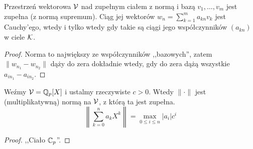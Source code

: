 \begin{fakt}
	Przestrzeń wektorowa $\mathcal V$ nad zupełnym ciałem z normą i bazą $v_1, \ldots, v_m$ jest zupełna (z normą supremum).
	Ciąg jej wektorów $w_n = \sum_{k=1}^m a_{kn}v_k$ jest Cauchy'ego, wtedy i tylko wtedy gdy takie są ciągi jego współczynników $(a_{kn})$ w ciele $\mathcal K$.
\end{fakt}

\begin{proof}
	Norma to największy ze współczynników ,,bazowych'', zatem $\|w_{n_1} - w_{n_2}\|$ dąży do zera dokładnie wtedy, gdy do zera dążą wszystkie $a_{i n_1} - a_{i n_2}$.
\end{proof}

\begin{fakt}
	Weźmy $\mathcal V = \mathbb Q_p[X]$ i ustalmy rzeczywiste $c > 0$.
	Wtedy $\|\cdot\|$ jest (multiplikatywną) normą na $\mathcal V$, z którą ta jest zupełna.
	\[
		\left\|\sum_{k=0}^n a_k X^k \right\| = \max_{0 \le i \le n} |a_i| c^i
	\]
\end{fakt}

\begin{proof}
	,,Ciało $\mathbb C_p$''.
\end{proof}